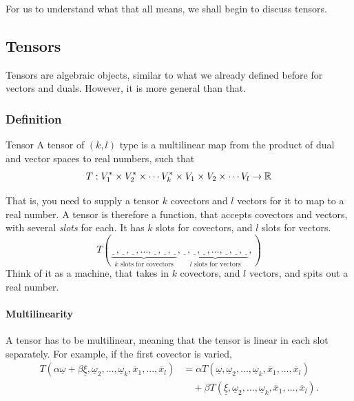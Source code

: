 		For us to understand what that all means, we shall begin to discuss tensors.
\newpage
\subsection{Tensors}
	Tensors are algebraic objects, similar to what we already defined before 
	for vectors and duals. However, it is more general than that.
	\subsubsection{Definition}
		\begin{definition}{Tensor}
			A tensor of $(k,l)$ type is a multilinear map 
			from the product of dual and vector spaces to real numbers,
			such that
			\begin{equation}
				\label{eq:tensor-defn}
				T:
				V^*_1 \times 
				V^*_2 \times 
				\cdots
				V^*_k \times
				V_1 \times
				V_2 \times
				\cdots
				V_l
				\to \mathbb{R}
			\end{equation}
		\end{definition}

		That is, you need to supply a tensor $k$ covectors and $l$ vectors 
		for it to map to a real number. A tensor is therefore a function, that accepts 
		covectors and vectors,
		with several \textit{slots} for each. It has $k$ slots for covectors, and $l$ slots
		for vectors.
		\[
			T(
			\underbrace{
				\underline{\phantom{x}},
				\underline{\phantom{x}},
				\underline{\phantom{x}},
				\ldots,
				\underline{\phantom{x}},
				\underline{\phantom{x}},
				\underline{\phantom{x}}
			}_{k\text{ slots for covectors}},
			\underbrace{
				\underline{\phantom{x}},
				\underline{\phantom{x}},
				\underline{\phantom{x}},
				\ldots,
				\underline{\phantom{x}},
				\underline{\phantom{x}},
				\underline{\phantom{x}}
			}_{l\text{ slots for vectors}},
			)
		\]
		Think of it as a machine, that takes in $k$ covectors, and $l$
		vectors, and spits out a real number. 

		\paragraph{Multilinearity} A tensor has to be multilinear, meaning that the tensor is linear in
		each slot separately. For example, if the first covector is varied,
		\begin{align*}
			T(\alpha\underline{\omega}+\beta\underline{\xi},
			\underline{\omega}_2,\ldots,\underline{\omega}_k,
			\overline x_1,\ldots,\overline x_l)
			&=
			\alpha
			T(\underline{\omega},\underline{\omega}_2,\ldots,
			\underline{\omega}_k,\overline x_1,\ldots,\overline x_l)
			\\
			&\quad+
			\beta
			T(\underline{\xi},\underline{\omega}_2,\ldots,
			\underline{\omega}_k,\overline x_1,\ldots,\overline x_l).
		\end{align*}
		
